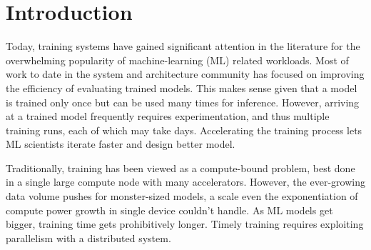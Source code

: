 \chapter {Introduction}

Today, training systems have gained significant attention in the literature for the overwhelming popularity of machine-learning (ML) related workloads. Most of work to date in the system and architecture community has focused on improving the efficiency of evaluating trained models. This makes sense given that a model is trained only once but can be used many times for inference. However, arriving at a trained model frequently requires experimentation, and thus multiple training runs, each of which may take days. Accelerating the training process lets ML scientists iterate faster and design better model.

Traditionally, training has been viewed as a compute-bound problem, best done in a single large compute node with many accelerators. However, the ever-growing data volume pushes for monster-sized models, a scale even the exponentiation of compute power growth in single device couldn't handle. As ML models get bigger, training time gets prohibitively longer. Timely training requires exploiting parallelism with a distributed system.

